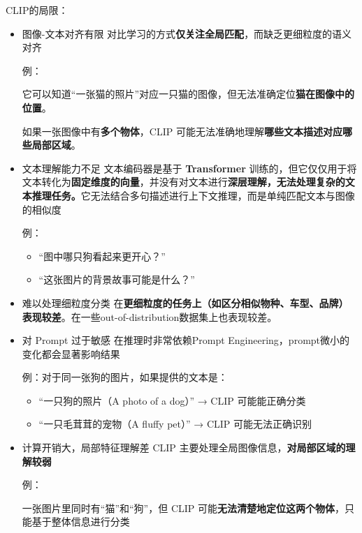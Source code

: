 \documentclass[zihao=false,fontset=windows]{ctexart}
\begin{document}
CLIP的局限：\par
\begin{itemize}
\item 图像-文本对齐有限
对比学习的方式\textbf{仅关注全局匹配}，而缺乏更细粒度的语义对齐\par
例：\par
它可以知道“一张猫的照片”对应一只猫的图像，但无法准确定位\textbf{猫在图像中的位置}。\par
如果一张图像中有\textbf{多个物体}，CLIP 可能无法准确地理解\textbf{哪些文本描述对应哪些局部区域}。\par
\item 文本理解能力不足
文本编码器是基于 \textbf{Transformer} 训练的，但它仅仅用于将文本转化为\textbf{固定维度的向量}，并没有对文本进行\textbf{深层理解，无法处理复杂的文本推理任务。}它无法结合多句描述进行上下文推理，而是单纯匹配文本与图像的相似度\par
例：\par
\begin{itemize}
\item “图中哪只狗看起来更开心？”
\item “这张图片的背景故事可能是什么？”
\end{itemize}
\item 难以处理细粒度分类
在\textbf{更细粒度的任务上（如区分相似物种、车型、品牌）表现较差}。在一些out-of-distribution数据集上也表现较差。\par
\item 对 Prompt 过于敏感
在推理时非常依赖Prompt Engineering，prompt微小的变化都会显著影响结果\par
例：对于同一张狗的图片，如果提供的文本是：\par
\begin{itemize}
\item “一只狗的照片（A photo of a dog）” → CLIP 可能能正确分类
\item “一只毛茸茸的宠物（A fluffy pet）” → CLIP 可能无法正确识别
\end{itemize}
\item 计算开销大，局部特征理解差
CLIP 主要处理全局图像信息，\textbf{对局部区域的理解较弱}\par
例：\par
一张图片里同时有“猫”和“狗”，但 CLIP 可能\textbf{无法清楚地定位这两个物体}，只能基于整体信息进行分类\par
\end{itemize}
\par\vspace{1.15em}\par\vspace{0.28em}
\end{document}
